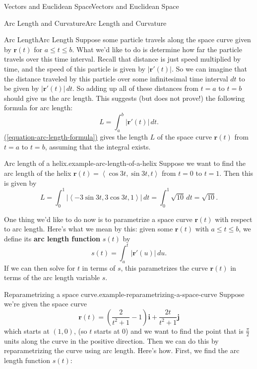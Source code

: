 \documentclass[10pt,]{book}
\newcommand{\terminology}[1]{\textbf{#1}}
\numberwithin{equation}{section}
\newcommand{\vv}[1]{\mathbf{#1}}
\newcommand{\dotprod}[1]{\left\langle #1 \right\rangle}
\begin{document}
\begin{chapterptx}{Vectors and Euclidean Space}{}{Vectors and Euclidean Space}{}{}
\begin{sectionptx}{Arc Length and Curvature}{}{Arc Length and Curvature}{}{}
\begin{subsectionptx}{Arc Length}{}{Arc Length}{}{}
Suppose some particle travels along the space curve given by \(\vv{r}(t)\) for \(a\leq t\leq b\). What we'd like to do is determine how far the particle travels over this time interval. Recall that distance is just speed multiplied by time, and the speed of this particle is given by \(|\vv{r}'(t)|\). So we can imagine that the distance traveled by this particle over some infinitesimal time interval \(dt\) to be given by \(|\vv{r}'(t)|\,dt\). So adding up all of these distances from \(t=a\) to \(t=b\) should give us the arc length. This suggests (but does not prove!) the following formula for arc length:%
%
\begin{equation}
L = \int_{a}^{b}|\vv{r}'(t)|\,dt.\label{equation-arc-length-formula}
\end{equation}
\hypertarget{p-1060}{}%
\hyperref[equation-arc-length-formula]{(\ref{equation-arc-length-formula})} gives the length \(L\) of the space curve \(\vv{r}(t)\) from \(t=a\) to \(t=b\), assuming that the integral exists.%
\begin{example}{Arc length of a helix.}{example-arc-length-of-a-helix}%
\hypertarget{p-1061}{}%
Suppose we want to find the arc length of the helix \(\vv{r}(t) = \dotprod{\cos 3t,\sin 3t, t}\) from \(t=0\) to \(t=1\). Then this is given by%
%
\begin{equation*}
L = \int_{0}^{1}|\dotprod{-3\sin3t, 3\cos3t, 1}|\,dt = \int_{0}^{1}\sqrt{10}\,dt = \sqrt{10}.
\end{equation*}
\end{example}
\hypertarget{p-1062}{}%
One thing we'd like to do now is to parametrize a space curve \(\vv{r}(t)\) with respect to arc length. Here's what we mean by this: given some \(\vv{r}(t)\) with \(a\leq t\leq b\), we define its \terminology{arc length function} \(s(t)\) by%
%
\begin{equation*}
s(t) = \int_{a}^{t}|\vv{r}'(u)|\,du.
\end{equation*}
\hypertarget{p-1063}{}%
If we can then solve for \(t\) in terms of \(s\), this parametrizes the curve \(\vv{r}(t)\) in terms of the arc length variable \(s\).%
\begin{example}{Reparametrizing a space curve.}{example-reparametrizing-a-space-curve}%
\hypertarget{p-1064}{}%
Suppose we're given the space curve%
%
\begin{equation*}
\vv{r}(t) = \left(\frac{2}{t^{2}+1}-1\right)\vv{i}+\frac{2t}{t^{2}+1}\vv{j}
\end{equation*}
\hypertarget{p-1065}{}%
which starts at \((1,0)\), (so \(t\) starts at \(0\)) and we want to find the point that is \(\frac{\pi}{2}\) units along the curve in the positive direction. Then we can do this by reparametrizing the curve using arc length. Here's how. First, we find the arc length function \(s(t)\):%

\end{example}
\end{subsectionptx}
\end{sectionptx}
\end{chapterptx}
\end{document}
